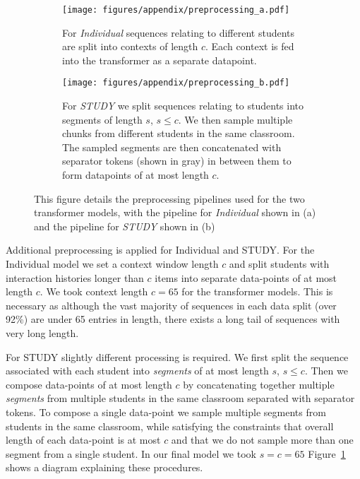 \documentclass{article}
\begin{document}
\label{section:app:preprocessing}
\newcommand\proprocessingA{89.0}
\newcommand\proprocessingB{170.69}
\newcommand\proprocessingScale{0.006\linewidth}
\begin{figure}[h]
    
    \begin{subfigure}[]{0.8\linewidth}
        
        \texttt{[image: figures/appendix/preprocessing\_a.pdf]}
        \caption{For \textit{Individual} sequences relating to different students are split into contexts of length $c$. Each context is fed into the transformer as a separate datapoint.}
    \end{subfigure}
    
    
    \begin{subfigure}[]{0.8\linewidth}
        
        \texttt{[image: figures/appendix/preprocessing\_b.pdf]}
        \caption{For \textit{STUDY} we split sequences relating to students into segments of length $s$, $s \leq c$. We then sample multiple chunks from different students in the same classroom. The sampled segments are then concatenated with separator tokens (shown in gray) in between them to form datapoints of at most length $c$. }
    \end{subfigure}
    
    \caption{This figure details the preprocessing pipelines used for the two transformer models, with the pipeline for \textit{Individual} shown in (a) and the pipeline for \textit{STUDY} shown in (b)}
    \label{fig:preprocessing}
\end{figure}

Additional preprocessing is applied for Individual and STUDY. For the Individual model we set a context window length $c$ and split students with interaction histories longer than $c$ items into separate data-points of at most length $c$. We took context length $c=65$ for the transformer models. This is necessary as although the vast majority of sequences in each data split (over 92\%) are under 65 entries in length, there exists a long tail of sequences with very long length. 

For STUDY slightly different processing is required. We first split the sequence associated with each student into \textit{segments} of at most length $s$, $s\leq c$. Then we compose data-points of at most length $c$ by concatenating together multiple \textit{segments} from multiple students in the same classroom separated with separator tokens. To compose a single data-point we sample multiple segments from students in the same classroom, while satisfying the constraints that overall length of each data-point is at most $c$ and that we do not sample more than one segment from a single student. In our final model we took $s=c=65$ Figure~\ref{fig:preprocessing} shows a diagram explaining these procedures.
\FloatBarrier
\end{document}
